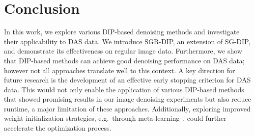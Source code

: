 \chapter{Conclusion}

In this work, we explore various DIP-based denoising methods and investigate their applicability to DAS data.
We introduce SGR-DIP, an extension of SG-DIP, and demonstrate its effectiveness on regular image data.
Furthermore, we show that DIP-based methods can achieve good denoising performance on DAS data; however not all approaches translate well to this context.
A key direction for future research is the development of an effective early stopping criterion for DAS data. This would not only enable the application of various DIP-based methods that showed promising results in our image denoising experiments but also reduce runtime, a major limitation of these approaches.
Additionally, exploring improved weight initialization strategies, e.g.\ through meta-learning~\cite{MetaDIP}, could further accelerate the optimization process.
